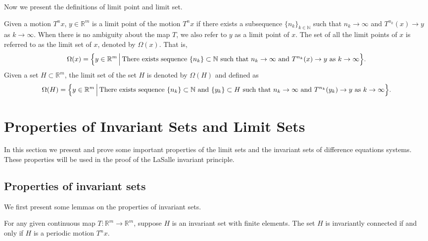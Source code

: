 \documentclass[10pt]{svmult}
\begin{document}
Now we present the definitions of limit point and limit set.
\begin{definition}\label{def:lim-set}
Given a motion $T^n x$, $y\in \mathbb{R}^m$ is a limit point of the motion $T^n x$ if there exists a subsequence $\{n_k\}_{k\in \mathbb{N}}$ such that $n_k \to \infty$ and $T^{n_k} (x) \to y$ as $k\to \infty$. When there is no ambiguity about the map $T$, we also refer to $y$ as a limit point of $x$. The set of all the limit points of $x$ is referred to as the limit set of $x$, denoted by $\Omega(x)$. That is,
\begin{equation*}
\Omega(x) = \Big{\{} y\in \mathbb{R}^m \,\Big|\, \text{There exists sequence }\{n_k\}\subset \mathbb{N} \text{ such that }n_k\to \infty\text{ and }T^{n_k}(x)\to y\text{ as }k\to \infty  \Big{\}}.
\end{equation*}
Given a set $H\subset \mathbb{R}^m$, the limit set of the set $H$ is denoted by $\Omega(H)$ and defined as
\begin{equation*}
\Omega(H) = \Big{\{} y\in \mathbb{R}^m \,\Big|\, \text{There exists sequence } \{n_k\}\subset \mathbb{N}\text{ and }\{y_k\}\subset H\text{ such that }n_k \to \infty \text{ and }T^{n_k}(y_k)\to y\text{ as }k\to \infty \Big{\}}.
\end{equation*}
\end{definition}


\section{Properties of Invariant Sets and Limit Sets}
In this section we present and prove some important properties of the limit sets and the invariant sets of difference equations systems. These properties will be used in the proof of the LaSalle invariant principle. 

\subsection{Properties of invariant sets}
We first present some lemmas on the properties of invariant sets.

\begin{lemma}\label{lem:inv-conn-period}
For any given continuous map $T:\mathbb{R}^m \to \mathbb{R}^m$, suppose $H$ is an invariant set with finite elements. The set $H$ is invariantly connected if and only if $H$ is a periodic motion $T^n x$.
\end{lemma}
\end{document}
